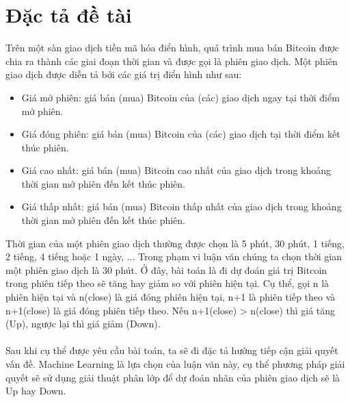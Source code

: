 \section{Đặc tả đề tài}
Trên một sàn giao dịch tiền mã hóa điển hình, quá trình mua bán Bitcoin được chia ra 
thành các giai đoạn thời gian và được gọi là phiên giao dịch. Một phiên giao dịch 
được diễn tả bởi các giá trị điển hình như sau:
\begin{itemize}
\item Giá mở phiên: giá bán (mua) Bitcoin của (các) giao dịch ngay tại thời 
điểm mở phiên.
\item Giá đóng phiên: giá bán (mua) Bitcoin của (các) giao dịch tại thời điểm 
kết thúc phiên.
\item Giá cao nhất: giá bán (mua) Bitcoin cao nhất của giao dịch trong khoảng 
thời gian mở phiên đến kết thúc phiên.
\item Giá thấp nhất: giá bán (mua) Bitcoin thấp nhất của giao dịch trong khoảng 
thời gian mở phiên đến kết thúc phiên.
\end{itemize}
Thời gian của một phiên giao dịch thường được chọn là 5 phút, 30 phút, 1 tiếng, 2 tiếng, 
4 tiếng hoặc 1 ngày, ... 
Trong phạm vi luận văn chúng ta chọn thời gian một phiên giao dịch là 30 phút.
Ở đây, bài toán là đi dự đoán giá trị Bitcoin trong phiên tiếp theo sẽ tăng 
hay giảm so với phiên hiện tại. Cụ thể, gọi n là phiên hiện tại và n(close) 
là giá đóng phiên hiện tại, n+1 là phiên tiếp theo và n+1(close) là giá đóng 
phiên tiếp theo. Nếu n+1(close) > n(close) thì giá tăng (Up), ngược lại thì 
giá giảm (Down).\\\\
Sau khi cụ thể được yêu cầu bài toán, ta sẽ đi đặc tả hướng tiếp cận giải quyết 
vấn đề. Machine Learning là lựa chọn của luận văn này, cụ thể phương pháp giải quyết 
sẽ sử dụng giải thuật phân lớp để dự đoán nhãn của phiên giao dịch sẽ là Up hay Down.

